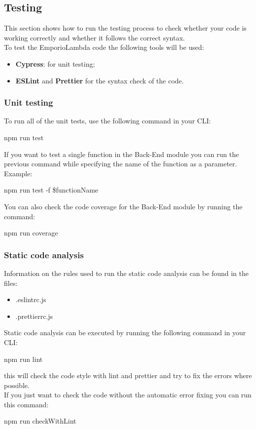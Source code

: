 \subsection{Testing}
This section shows how to run the testing process to check whether your code is working correctly and whether it follows the correct syntax. \\ 
To test the EmporioLambda code the following tools will be used:
\begin{itemize}
\item \textbf{Cypress}: for unit testing;
\item \textbf{ESLint} and \textbf{Prettier} for the syntax check of the code.
\end{itemize}

\subsubsection{Unit testing}
To run all of the unit tests, use the following command in your CLI:
\begin{center}
npm run test
\end{center}
If you want to test a single function in the Back-End module you can run the previous command while specifying the name of the function as a parameter.\\
Example:
\begin{center}
npm run test -f \$functionName
\end{center}
You can also check the code coverage for the Back-End module by running the command:
\begin{center}
npm run coverage
\end{center}

\subsubsection{Static code analysis}
Information on the rules used to run the static code analysis can be found in the files:
\begin{itemize}
\item .eslintrc.js
\item .prettierrc.js
\end{itemize}
Static code analysis can be executed by running the following command in your CLI:
\begin{center}
npm run lint
\end{center}
this will check the code style with lint and prettier and try to fix the errors where possible.\\ 
If you just want to check the code without the automatic error fixing you can run this command:
\begin{center}
npm run checkWithLint
\end{center}